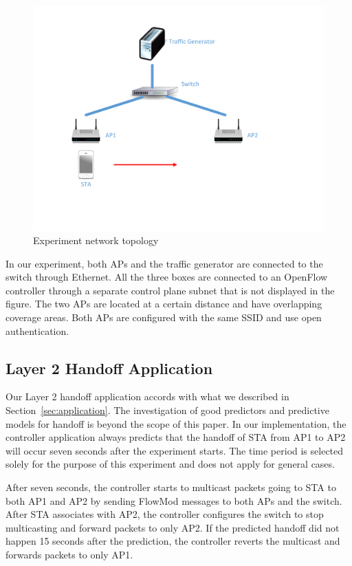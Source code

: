 \begin{figure}
\centering
\includegraphics[trim=1.25in 1.5in 2in 0.5in, clip, width=.6\textwidth]{figures/topology}
\caption{Experiment network topology}
\label{fig:topology}
\end{figure}

In our experiment, both APs and the traffic generator are connected to the switch
through  Ethernet. All the three boxes are connected to an OpenFlow
controller through a separate control plane subnet that is not displayed in the
figure.  The two APs are located at a certain distance and have overlapping coverage areas.  Both APs are configured with
the same SSID and use open authentication. 

\subsection{Layer 2 Handoff Application}
Our Layer 2 handoff application accords with what we described in
Section~\ref{sec:application}. The investigation of good
predictors and predictive models for handoff is beyond the scope of this paper.
In our implementation, the controller application always predicts that the
handoff of STA from AP1 to AP2 will occur seven seconds after the experiment starts.
The time period is selected solely for the purpose of this experiment and
does not apply for general cases. 
 
After seven seconds, the controller starts to multicast packets going to STA to both
AP1 and AP2 by sending FlowMod messages to both APs and the switch. After STA
associates with AP2, the controller configures the switch to stop multicasting
and forward packets to only AP2. If the predicted handoff did not happen 15
seconds after the prediction, the controller reverts the multicast and forwards
packets to only AP1.




